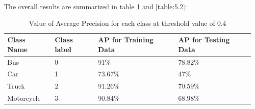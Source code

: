 The overall results are summarized in table \ref{table:5.1} and \ref{table:5.2}:
\begin{table}[H]
    \caption{Value of Average Precision for each class at threshold value of 0.4}
    \label{table:5.1}
      \begin{center}
        \scalebox{1.1}
        {\begin{tabular}{|l |l |l |l |}
        \hline
        Class Name  & Class label  & AP for Training Data & AP for Testing Data
        \\ \hline
        Bus &  0 & 91\% & 78.82\%
        \\ \hline
        Car & 1 & 73.67\% & 47\%
        \\ \hline  
        Truck & 2 & 91.26\% & 70.59\%
        \\ \hline  
        Motorcycle & 3 & 90.84\% & 68.98\%
        \\ \hline 
        \end{tabular}}
      \end{center}
\end{table}

